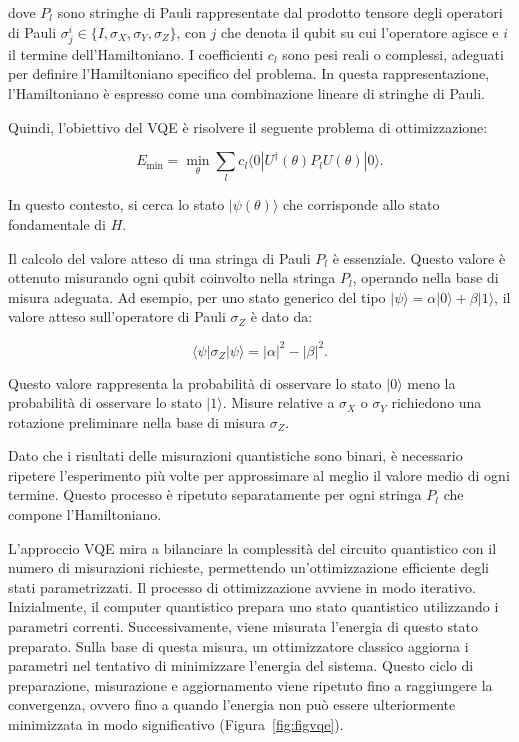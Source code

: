 dove \(P_l\) sono stringhe di Pauli rappresentate dal prodotto tensore degli 
operatori di Pauli \(\sigma_j^i \in \{I, \sigma_X, \sigma_Y, \sigma_Z\}\), 
con \(j\) che denota il qubit su cui l'operatore agisce e \(i\) il termine 
dell'Hamiltoniano. I coefficienti \(c_l\) sono pesi reali o complessi, 
adeguati per definire l'Hamiltoniano specifico del problema. In questa 
rappresentazione, l'Hamiltoniano è espresso come una combinazione lineare 
di stringhe di Pauli.

Quindi, l'obiettivo del VQE è risolvere il seguente problema di ottimizzazione:

\begin{equation}
    E_{\text{min}} = \min_\theta \sum_{l} c_l \langle 0 | U^\dagger(\theta) P_l U(\theta) | 0 \rangle.
\end{equation}

In questo contesto, si cerca lo stato \(|\psi(\theta)\rangle\) che corrisponde 
allo stato fondamentale di \(H\).

Il calcolo del valore atteso di una stringa di Pauli \(P_l\) è essenziale. 
Questo valore è ottenuto misurando ogni qubit coinvolto nella stringa \(P_l\), 
operando nella base di misura adeguata. Ad esempio, per uno stato generico del 
tipo \(|\psi\rangle = \alpha |0\rangle + \beta |1\rangle\), il valore atteso 
sull'operatore di Pauli \(\sigma_Z\) è dato da:

\begin{equation}
    \langle \psi | \sigma_Z | \psi \rangle = |\alpha|^2 - |\beta|^2.
\end{equation}

Questo valore rappresenta la probabilità di osservare lo stato \(|0\rangle\) meno 
la probabilità di osservare lo stato \(|1\rangle\). Misure relative a \(\sigma_X\) 
o \(\sigma_Y\) richiedono una rotazione preliminare nella base di misura \(\sigma_Z\).

Dato che i risultati delle misurazioni quantistiche sono binari, è necessario 
ripetere l'esperimento più volte per approssimare al meglio il valore medio 
di ogni termine. Questo processo è ripetuto separatamente per ogni stringa 
\(P_l\) che compone l'Hamiltoniano.

L'approccio VQE mira a bilanciare la complessità del circuito quantistico con il 
numero di misurazioni richieste, permettendo un'ottimizzazione efficiente degli 
stati parametrizzati. Il processo di ottimizzazione avviene in modo iterativo. 
Inizialmente, il computer quantistico prepara uno stato quantistico utilizzando 
i parametri correnti. Successivamente, viene misurata l'energia di questo stato 
preparato. Sulla base di questa misura, un ottimizzatore classico aggiorna i 
parametri nel tentativo di minimizzare l'energia del sistema. Questo ciclo di 
preparazione, misurazione e aggiornamento viene ripetuto fino a raggiungere la 
convergenza, ovvero fino a quando l'energia non può essere ulteriormente 
minimizzata in modo significativo (Figura~\ref{fig:figvqe}).

